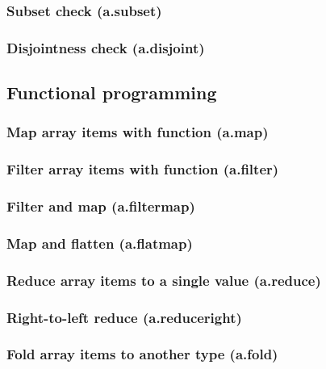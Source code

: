 \documentclass{article}
\theoremstyle{definition}
\begin{document}
\subsubsection{Subset check (a.subset)}

\subsubsection{Disjointness check (a.disjoint)}

\subsection{Functional programming}

\subsubsection{Map array items with function (a.map)}

\subsubsection{Filter array items with function (a.filter)}

\subsubsection{Filter and map (a.filtermap)}

\subsubsection{Map and flatten (a.flatmap)}

\subsubsection{Reduce array items to a single value (a.reduce)}

\subsubsection{Right-to-left reduce (a.reduceright)}

\subsubsection{Fold array items to another type (a.fold)}
\end{document}
